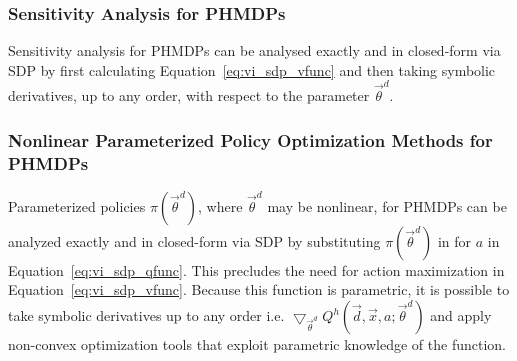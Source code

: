 \subsubsection{Sensitivity Analysis for PHMDPs}


Sensitivity analysis for PHMDPs can be analysed exactly and in closed-form via SDP by first calculating Equation~\eqref{eq:vi_sdp_vfunc} and then taking symbolic derivatives, up to any order, with respect to the parameter {\footnotesize $\vec{\theta}^{d}$}.


\subsubsection{Nonlinear Parameterized Policy Optimization Methods for PHMDPs}

Parameterized policies {\footnotesize $ \pi(\vec{\theta}^{d}) $}, where {\footnotesize $\vec{\theta}^{d}$} may be nonlinear, for PHMDPs can be analyzed exactly and in closed-form via SDP by substituting {\footnotesize $ \pi(\vec{\theta}^{d}) $} in for {\footnotesize  $ a $} in Equation~\eqref{eq:vi_sdp_qfunc}. This precludes the need for action maximization in Equation~\eqref{eq:vi_sdp_vfunc}. Because this function is parametric, it is possible to take symbolic derivatives up to any order i.e. {\footnotesize $\bigtriangledown_{\vec{\theta}^{d}} Q^{h}(\vec{d}, \vec{x}, a; \vec{\theta}^{d})$ } and apply non-convex optimization tools
that exploit parametric knowledge of the function. 

